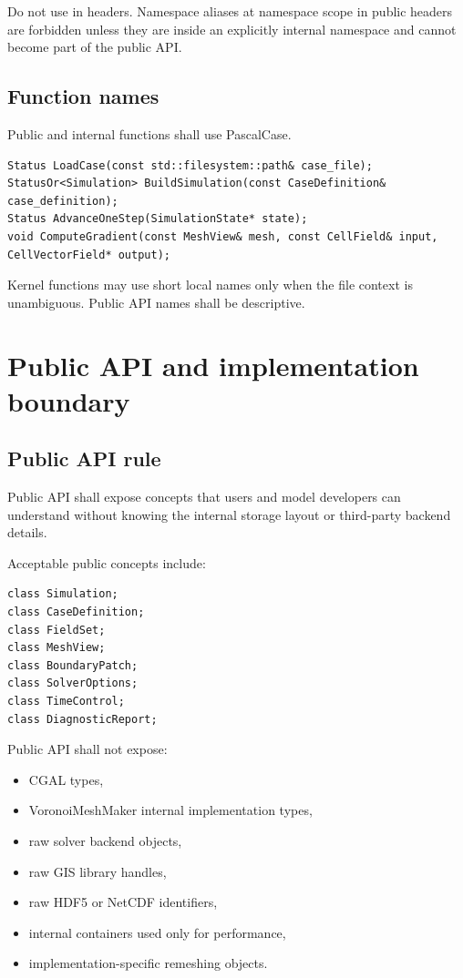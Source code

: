 \documentclass[11pt,a4paper]{article}
\newcommand{\Code}[1]{\texttt{\detokenize{#1}}}
\begin{document}
Do not use \Code{using namespace} in headers. Namespace aliases at namespace scope in public headers are forbidden unless they are inside an explicitly internal namespace and cannot become part of the public API.

\subsection{Function names}

Public and internal functions shall use PascalCase.

\begin{lstlisting}
Status LoadCase(const std::filesystem::path& case_file);
StatusOr<Simulation> BuildSimulation(const CaseDefinition& case_definition);
Status AdvanceOneStep(SimulationState* state);
void ComputeGradient(const MeshView& mesh, const CellField& input, CellVectorField* output);
\end{lstlisting}

Kernel functions may use short local names only when the file context is unambiguous. Public API names shall be descriptive.

\section{Public API and implementation boundary}

\subsection{Public API rule}

Public API shall expose concepts that users and model developers can understand without knowing the internal storage layout or third-party backend details.

Acceptable public concepts include:

\begin{lstlisting}
class Simulation;
class CaseDefinition;
class FieldSet;
class MeshView;
class BoundaryPatch;
class SolverOptions;
class TimeControl;
class DiagnosticReport;
\end{lstlisting}

Public API shall not expose:

\begin{itemize}
  \item CGAL types,
  \item VoronoiMeshMaker internal implementation types,
  \item raw solver backend objects,
  \item raw GIS library handles,
  \item raw HDF5 or NetCDF identifiers,
  \item internal containers used only for performance,
  \item implementation-specific remeshing objects.
\end{itemize}
\end{document}

